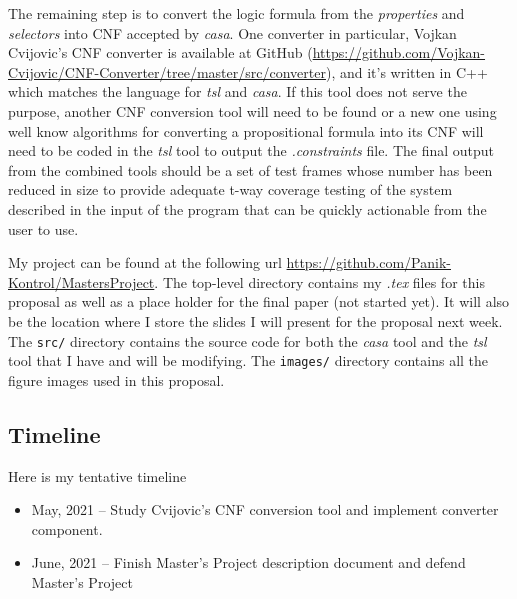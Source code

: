 \documentclass[a4full,12pt]{article}
\begin{document}
The remaining step is to convert the logic formula from the \emph{properties} and \emph{selectors}
  into CNF accepted by \emph{casa}. One converter in particular, Vojkan Cvijovic's CNF converter is
  available at GitHub (\url{https://github.com/Vojkan-Cvijovic/CNF-Converter/tree/master/src/converter}),
  and it's written in C++ which matches the language for \emph{tsl} and
  \emph{casa}. If this tool does not serve the purpose, another CNF conversion tool will need to be
  found or a new one using well know algorithms for converting a propositional formula into its CNF
  will need to be coded in the \emph{tsl} tool to output the \emph{.constraints} file. The final
  output from the combined tools should be a set of test frames whose number has been reduced in size
  to provide adequate t-way coverage testing of the system described in the input of the program that
  can be quickly actionable from the user to use.
  
My project can be found at the following url \url{https://github.com/Panik-Kontrol/MastersProject}.
  The top-level directory contains my \emph{.tex} files for this proposal as well as a place
  holder for the final paper (not started yet). It will also be the location where I store the
  slides I will present for the proposal next week. The \texttt{src/} directory contains the source
  code for both the \emph{casa} tool and the \emph{tsl} tool that I have and will be modifying.
  The \texttt{images/} directory contains all the figure images used in this proposal.
  
  \subsection{Timeline}
  Here is my tentative timeline
  \begin{itemize}
  \item May, 2021 -- Study Cvijovic's CNF conversion tool and implement converter component.
  \item June, 2021 -- Finish Master's Project description document and defend Master's Project
  \end{itemize}
\end{document}
